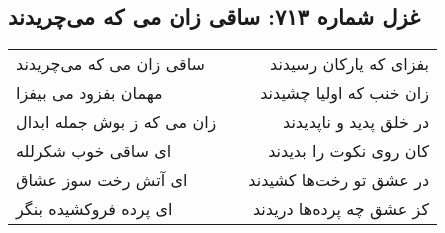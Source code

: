 \begin{center}
\section*{غزل شماره ۷۱۳: ساقی زان می که می‌چریدند}
\label{sec:0713}
\begin{longtable}{l p{0.5cm} r}
ساقی زان می که می‌چریدند
&&
بفزای که یارکان رسیدند
\\
مهمان بفزود می بیفزا
&&
زان خنب که اولیا چشیدند
\\
زان می که ز بوش جمله ابدال
&&
در خلق پدید و ناپدیدند
\\
ای ساقی خوب شکرلله
&&
کان روی نکوت را بدیدند
\\
ای آتش رخت سوز عشاق
&&
در عشق تو رخت‌ها کشیدند
\\
ای پرده فروکشیده بنگر
&&
کز عشق چه پرده‌ها دریدند
\\
\end{longtable}
\end{center}
